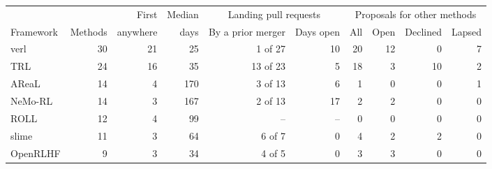 \begin{tabular}{lrrrrrrrrr}
\toprule
 & & First & Median & \multicolumn{2}{c}{Landing pull requests} & \multicolumn{4}{c}{Proposals for other methods} \\
\cmidrule(lr){5-6} \cmidrule(lr){7-10}
Framework & Methods & anywhere & days & By a prior merger & Days open & All & Open & Declined & Lapsed \\
\midrule
verl & 30 & 21 & 25 & 1 of 27 & 10 & 20 & 12 & 0 & 7 \\
TRL & 24 & 16 & 35 & 13 of 23 & 5 & 18 & 3 & 10 & 2 \\
AReaL & 14 & 4 & 170 & 3 of 13 & 6 & 1 & 0 & 0 & 1 \\
NeMo-RL & 14 & 3 & 167 & 2 of 13 & 17 & 2 & 2 & 0 & 0 \\
ROLL & 12 & 4 & 99 & -- & -- & 0 & 0 & 0 & 0 \\
slime & 11 & 3 & 64 & 6 of 7 & 0 & 4 & 2 & 2 & 0 \\
OpenRLHF & 9 & 3 & 34 & 4 of 5 & 0 & 3 & 3 & 0 & 0 \\
\bottomrule
\end{tabular}
